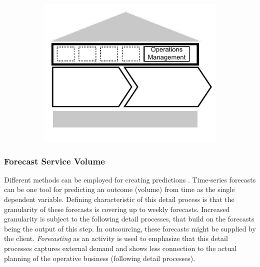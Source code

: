 	\begin{figure}[caption={\textsc{Operations Management} Process}, label={fig:wfm}]
		\begin{subfigure}[c]{.45\textwidth}
			\begin{center}
				\includegraphics{figures/processes/operationsmanagement.pdf}
			\end{center}
		\end{subfigure}
		\begin{subfigure}[c]{.45\textwidth}
			\begin{center}
			\end{center}
		\end{subfigure}
		
	\end{figure}
	
	\subsubsection{Forecast Service Volume}
	Different methods can be employed for creating predictions \citep{9780470525906}. Time-series forecasts can be one tool for predicting an outcome (volume) from time as the single dependent variable. Defining characteristic of this detail process is that the granularity of these forecasts is covering up to weekly forecasts. Increased granularity is subject to the following detail processes, that build on the forecasts being the output of this step. In outsourcing, these forecasts might be supplied by the client. \textit{Forecasting} as an activity is used to emphasize that this detail processes captures external demand and shows less connection to the actual planning of the operative business (\cf following detail processes). 
	
